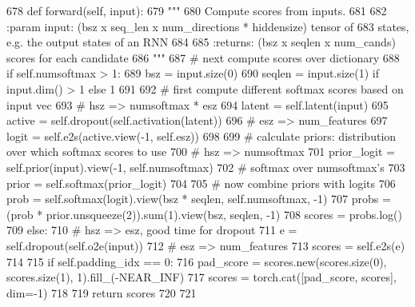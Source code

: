 \begin{DoxyCode}
678     \textcolor{keyword}{def }forward(self, input):
679         \textcolor{stringliteral}{"""}
680 \textcolor{stringliteral}{        Compute scores from inputs.}
681 \textcolor{stringliteral}{}
682 \textcolor{stringliteral}{        :param input: (bsz x seq\_len x num\_directions * hiddensize) tensor of}
683 \textcolor{stringliteral}{                       states, e.g. the output states of an RNN}
684 \textcolor{stringliteral}{}
685 \textcolor{stringliteral}{        :returns: (bsz x seqlen x num\_cands) scores for each candidate}
686 \textcolor{stringliteral}{        """}
687         \textcolor{comment}{# next compute scores over dictionary}
688         \textcolor{keywordflow}{if} self.numsoftmax > 1:
689             bsz = input.size(0)
690             seqlen = input.size(1) \textcolor{keywordflow}{if} input.dim() > 1 \textcolor{keywordflow}{else} 1
691 
692             \textcolor{comment}{# first compute different softmax scores based on input vec}
693             \textcolor{comment}{# hsz => numsoftmax * esz}
694             latent = self.latent(input)
695             active = self.dropout(self.activation(latent))
696             \textcolor{comment}{# esz => num\_features}
697             logit = self.e2s(active.view(-1, self.esz))
698 
699             \textcolor{comment}{# calculate priors: distribution over which softmax scores to use}
700             \textcolor{comment}{# hsz => numsoftmax}
701             prior\_logit = self.prior(input).view(-1, self.numsoftmax)
702             \textcolor{comment}{# softmax over numsoftmax's}
703             prior = self.softmax(prior\_logit)
704 
705             \textcolor{comment}{# now combine priors with logits}
706             prob = self.softmax(logit).view(bsz * seqlen, self.numsoftmax, -1)
707             probs = (prob * prior.unsqueeze(2)).sum(1).view(bsz, seqlen, -1)
708             scores = probs.log()
709         \textcolor{keywordflow}{else}:
710             \textcolor{comment}{# hsz => esz, good time for dropout}
711             e = self.dropout(self.o2e(input))
712             \textcolor{comment}{# esz => num\_features}
713             scores = self.e2s(e)
714 
715         \textcolor{keywordflow}{if} self.padding\_idx == 0:
716             pad\_score = scores.new(scores.size(0), scores.size(1), 1).fill\_(-NEAR\_INF)
717             scores = torch.cat([pad\_score, scores], dim=-1)
718 
719         \textcolor{keywordflow}{return} scores
720 
721 
\end{DoxyCode}
\mbox{\label{classparlai_1_1agents_1_1legacy__agents_1_1seq2seq_1_1modules__v1_1_1OutputLayer_a0e8baf4ecbc8a3ff9e6a04aa313e7021}} 
